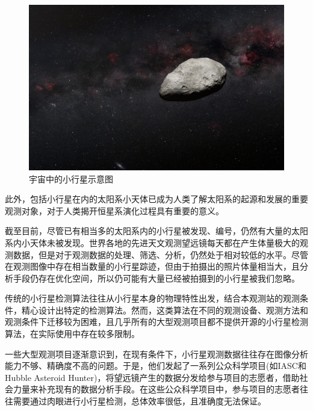 \documentclass[12pt,a4paper]{article}%
\begin{document}
\begin{figure}[H]%
    \centering
    \begin{minipage}{0.7\textwidth}%
        \centering
        \includegraphics[width=1.0%
            \textwidth]{asteroid}%
        \caption{\fontsize{10pt}{15pt}\selectfont 宇宙中的小行星示意图}%
    \end{minipage}
\end{figure}

此外，包括小行星在内的太阳系小天体已成为人类了解太阳系的起源和发展的重要观测对象，对于人类揭开恒星系演化过程具有重要的意义。

截至目前，尽管已有相当多的太阳系内的小行星被发现、编号，仍然有大量的太阳系内小天体未被发现。世界各地的先进天文观测望远镜每天都在产生体量极大的观测数据，但是对于观测数据的处理、筛选、分析，仍然处于相对较低的水平。尽管在观测图像中存在相当数量的小行星踪迹，但由于拍摄出的照片体量相当大，且分析手段仍存在优化空间，所以仍可能有大量已经被拍摄到的小行星被我们忽略。

传统的小行星检测算法往往从小行星本身的物理特性出发，结合本观测站的观测条件，精心设计出特定的检测算法。然而，这类算法在不同的观测设备、观测方法和观测条件下迁移较为困难，且几乎所有的大型观测项目都不提供开源的小行星检测算法，在实际使用中存在较多限制。

一些大型观测项目逐渐意识到，在现有条件下，小行星观测数据往往存在图像分析能力不够、精确度不高的问题。于是，他们发起了一系列公众科学项目(如IASC和Hubble Asteroid Hunter)，将望远镜产生的数据分发给参与项目的志愿者，借助社会力量来补充现有的数据分析手段。在这些公众科学项目中，参与项目的志愿者往往需要通过肉眼进行小行星检测，总体效率很低，且准确度无法保证。
\end{document}
